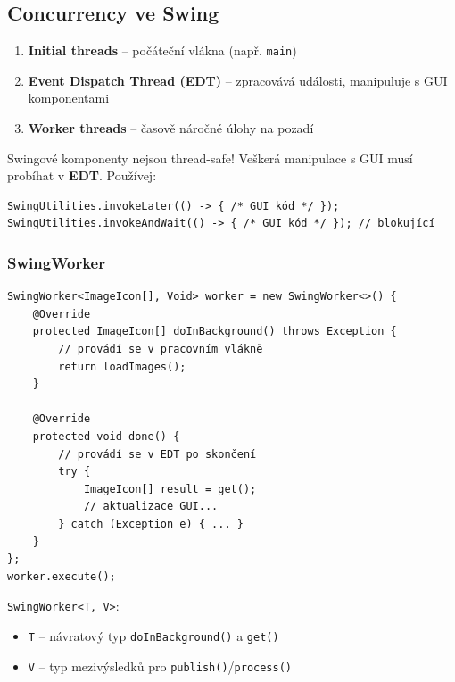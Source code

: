 \documentclass[11pt,a4paper]{article}
\begin{document}
\subsection{Concurrency ve Swing}

\begin{tcolorbox}[defbox,title=Tři druhy vláken ve Swing]
\begin{enumerate}
    \item \textbf{Initial threads} -- počáteční vlákna (např. \texttt{main})
    \item \textbf{Event Dispatch Thread (EDT)} -- zpracovává události, manipuluje s GUI komponentami
    \item \textbf{Worker threads} -- časově náročné úlohy na pozadí
\end{enumerate}
\end{tcolorbox}

\begin{tcolorbox}[warnbox,title=Pravidlo EDT]
Swingové komponenty nejsou thread-safe! Veškerá manipulace s GUI musí probíhat v \textbf{EDT}. Používej:
\begin{verbatim}
SwingUtilities.invokeLater(() -> { /* GUI kód */ });
SwingUtilities.invokeAndWait(() -> { /* GUI kód */ }); // blokující
\end{verbatim}
\end{tcolorbox}

\subsubsection{SwingWorker}

\begin{verbatim}
SwingWorker<ImageIcon[], Void> worker = new SwingWorker<>() {
    @Override
    protected ImageIcon[] doInBackground() throws Exception {
        // provádí se v pracovním vlákně
        return loadImages();
    }
    
    @Override
    protected void done() {
        // provádí se v EDT po skončení
        try {
            ImageIcon[] result = get();
            // aktualizace GUI...
        } catch (Exception e) { ... }
    }
};
worker.execute();
\end{verbatim}

\begin{tcolorbox}[tipbox,title=Generické parametry SwingWorker]
\texttt{SwingWorker<T, V>}:
\begin{itemize}
    \item \texttt{T} -- návratový typ \texttt{doInBackground()} a \texttt{get()}
    \item \texttt{V} -- typ mezivýsledků pro \texttt{publish()}/\texttt{process()}
\end{itemize}
\end{tcolorbox}
\end{document}
